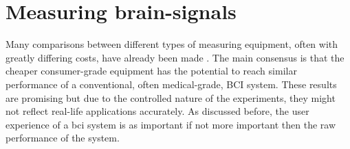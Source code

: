 

\lipsum[1-3]


\section{Measuring brain-signals}
\label{sec:biomedical_signals_measuring}

\lipsum[1-2]




Many comparisons between different types of measuring equipment, often with greatly differing costs, have already been made \citep{bci_cheap_viability1, bci_cheap_viability2, bci_cheap_viability3, bci_cheap_viability4, bci_cheap_viability5}.
The main consensus is that the cheaper consumer-grade equipment has the potential to reach similar performance of a conventional, often medical-grade, BCI system.
These results are promising but due to the controlled nature of the experiments, they might not reflect real-life applications accurately.
As discussed before, the user experience of a \gls{bci} system is as important if not more important then the raw performance of the system.

